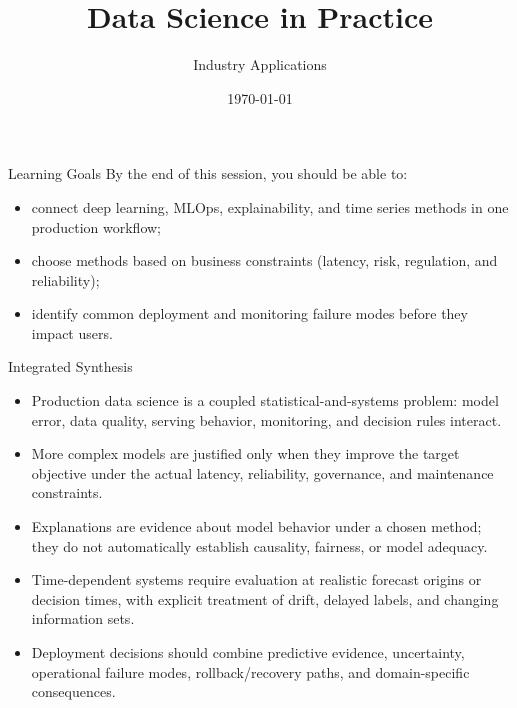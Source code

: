 \documentclass[aspectratio=169]{beamer}
\title{Data Science in Practice}
\subtitle{Industry Applications}
\date{\today}
\begin{document}
\begin{frame}
  \titlepage
\end{frame}

\begin{frame}{Learning Goals}
  By the end of this session, you should be able to:
  \begin{itemize}
    \item connect deep learning, MLOps, explainability, and time series methods in one production workflow;
    \item choose methods based on business constraints (latency, risk, regulation, and reliability);
    \item identify common deployment and monitoring failure modes before they impact users.
  \end{itemize}
\end{frame}

\tocslide






\begin{frame}{Integrated Synthesis}
  \begin{itemize}
    \item Production data science is a coupled statistical-and-systems problem: model error, data quality, serving behavior, monitoring, and decision rules interact.
    \item More complex models are justified only when they improve the target objective under the actual latency, reliability, governance, and maintenance constraints.
    \item Explanations are evidence about model behavior under a chosen method; they do not automatically establish causality, fairness, or model adequacy.
    \item Time-dependent systems require evaluation at realistic forecast origins or decision times, with explicit treatment of drift, delayed labels, and changing information sets.
    \item Deployment decisions should combine predictive evidence, uncertainty, operational failure modes, rollback/recovery paths, and domain-specific consequences.
  \end{itemize}
\end{frame}
\end{document}
